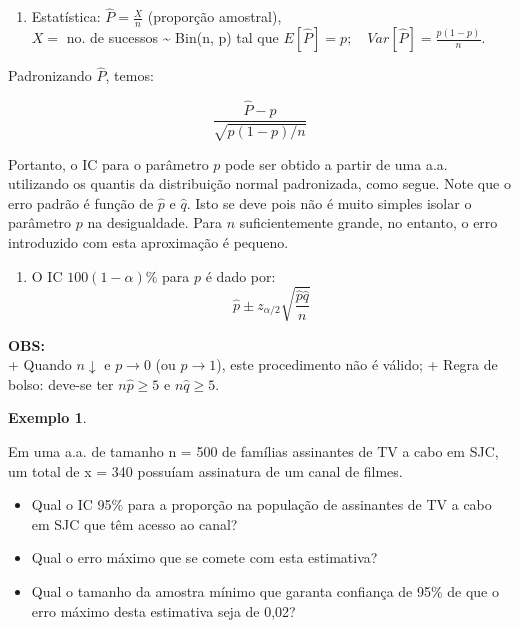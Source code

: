 \documentclass[
]{book}
\providecommand{\tightlist}{%
  \setlength{\itemsep}{0pt}\setlength{\parskip}{0pt}}
\theoremstyle{definition}
\theoremstyle{definition}
\newtheorem{example}{Exemplo}[chapter]
\theoremstyle{definition}
\theoremstyle{remark}
\begin{document}
\begin{enumerate}
\def\labelenumi{\arabic{enumi})}
\tightlist
\item
  Estatística: \(\widehat{P} = \frac{X}{n}\) (proporção amostral),\\
  \(X=\) no. de sucessos \textasciitilde{} Bin(n, p) tal que \(E[\widehat{P}] = p; \quad Var[\widehat{P}] = \frac{p(1-p)}{n}\).
\end{enumerate}

Padronizando \(\widehat{P}\), temos:

\[\frac{\widehat{P}-p}{\sqrt{p(1-p)/n}}\]

Portanto, o IC para o parâmetro \(p\) pode ser obtido a partir de uma a.a. utilizando os quantis da distribuição normal padronizada, como segue. Note que o erro padrão é função de \(\hat{p}\) e \(\hat{q}\). Isto se deve pois não é muito simples isolar o parâmetro \(p\) na desigualdade. Para \(n\) suficientemente grande, no entanto, o erro introduzido com esta aproximação é pequeno.

\begin{enumerate}
\def\labelenumi{\arabic{enumi})}
\setcounter{enumi}{1}
\tightlist
\item
  O IC \(100(1-\alpha)\%\) para \(p\) é dado por:
  \[\widehat{p} \pm  z_{\alpha/2} \sqrt{\frac{\hat{p}\hat{q}}{n}}\]
\end{enumerate}

\textbf{OBS:}\\
+ Quando \(n \downarrow\) e \(p \rightarrow 0\) (ou \(p \rightarrow 1\)), este procedimento não é válido;
+ Regra de bolso: deve-se ter \(n\hat{p} \geq 5\) e \(n\hat{q} \geq 5\).

\begin{example}
\protect\hypertarget{exm:unnamed-chunk-9}{}{\label{exm:unnamed-chunk-9} }
\end{example}

Em uma a.a. de tamanho n = 500 de famílias assinantes de TV a cabo em SJC, um total de x = 340 possuíam assinatura de um canal de filmes.

\begin{itemize}
\tightlist
\item
  Qual o IC 95\% para a proporção na população de assinantes de TV a cabo em SJC que têm acesso ao canal?
\item
  Qual o erro máximo que se comete com esta estimativa?
\item
  Qual o tamanho da amostra mínimo que garanta confiança de 95\% de que o erro máximo desta estimativa seja de 0,02?
\end{itemize}
\end{document}
